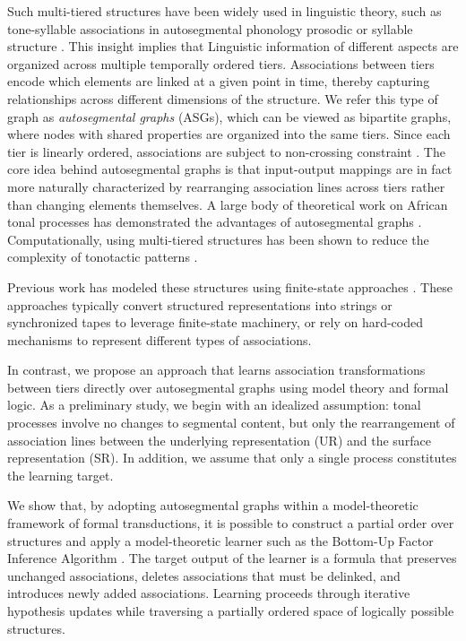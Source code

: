 \documentclass[pmlr]{jmlr}%
\begin{document}
Such multi-tiered structures have been widely used in linguistic 
theory, such as tone-syllable associations in autosegmental 
phonology \citep{goldsmith1976autosegmental}
prosodic or syllable structure \citep{hayes1980metrical,
	sagey1986representation}. This insight implies that 
Linguistic information of different aspects are organized across multiple 
temporally ordered tiers. Associations between tiers encode which 
elements are linked at a given point in time, thereby capturing 
relationships across different dimensions of the structure. We
refer this type of graph as \textit{autosegmental graphs} (ASGs),
which can be viewed as bipartite graphs, where 
nodes with shared properties are organized into the same tiers. 
Since each tier is linearly ordered, associations are subject to 
non-crossing constraint \citep[NCC,][]{bird1994one,goldsmith1976autosegmental}.
The core idea behind autosegmental graphs is that input-output 
mappings are in fact more naturally characterized by rearranging 
association lines across tiers rather than changing elements themselves.
A large body of theoretical work on African tonal processes has demonstrated the 
advantages of autosegmental graphs \citep{hyman2009representation}. 
Computationally, 
using multi-tiered structures has been shown to reduce the complexity of 
tonotactic patterns \citep{jardineComputationallyTone2016}.


Previous work has modeled these structures using finite-state 
approaches \citep{wiebe1992modelling,bird1994one,yli2013finite,
	yli2015three}. These approaches typically convert structured 
representations into strings or synchronized tapes to leverage 
finite-state machinery, or rely on hard-coded mechanisms to 
represent different types of associations.

In contrast, we propose an approach that learns association 
transformations between tiers directly over autosegmental 
graphs using model theory and formal logic. As a preliminary 
study, we begin with an idealized assumption: tonal processes 
involve no changes to segmental content, but only the 
rearrangement of association lines between the underlying 
representation (UR) and the surface representation (SR). 
In addition, we assume that only a single process constitutes 
the learning target. 

We show that, by adopting autosegmental graphs within a 
model-theoretic framework of formal transductions, it is 
possible to construct a partial order over structures and 
apply a model-theoretic learner such as the Bottom-Up Factor 
Inference Algorithm \citep{chandleeBufia2019,rawski2021structure}. 
The target output of the learner is a formula that preserves 
unchanged associations, deletes associations that must be delinked, and 
introduces newly added associations. Learning proceeds through iterative 
hypothesis updates while traversing a partially ordered space of logically possible structures.
\end{document}
